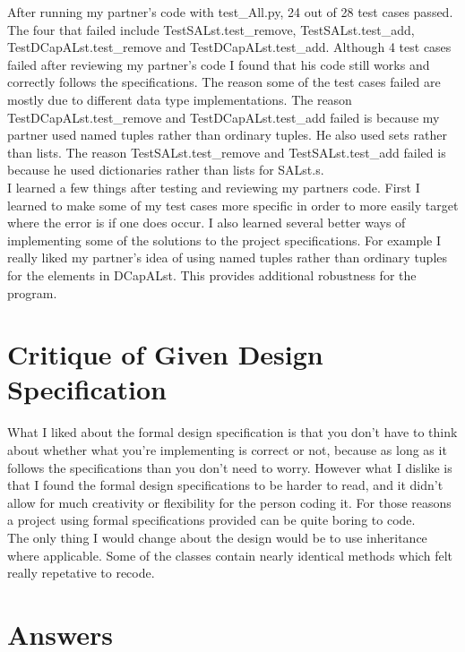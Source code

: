 \documentclass[12pt]{article}
\begin{document}
After running my partner's code with test_All.py, 24 out of 28 test cases passed. The four that failed include TestSALst.test\_remove, TestSALst.test\_add, TestDCapALst.test\_remove and TestDCapALst.test\_add.
Although 4 test cases failed after reviewing my partner's code I found that his code still works and correctly follows the specifications. The reason some of the test cases failed are mostly
due to different data type implementations. The reason TestDCapALst.test\_remove and TestDCapALst.test\_add failed is because my partner used named tuples rather than ordinary tuples. He also used sets
rather than lists. The reason TestSALst.test\_remove and TestSALst.test\_add failed is because he used dictionaries rather than lists for SALst.s.\\
I learned a few things after testing and reviewing my partners code. First I learned to make some of my test cases more specific in order to more easily target where the error is if one does occur.
I also learned several better ways of implementing some of the solutions to the project specifications. For example I really liked my partner's idea of using named tuples rather than ordinary tuples for the
elements in DCapALst. This provides additional robustness for the program.

\section{Critique of Given Design Specification}

What I liked about the formal design specification is that you don't have to think about whether what you're implementing is correct or not, because
as long as it follows the specifications than you don't need to worry. However what I dislike is that I found the formal design specifications to be harder to read,
and it didn't allow for much creativity or flexibility for the person coding it. For those reasons a project using formal specifications provided can be quite boring to code.\\
The only thing I would change about the design would be to use inheritance where applicable. Some of the classes contain nearly identical methods which felt really repetative to recode.

\section{Answers}
\end{document}
